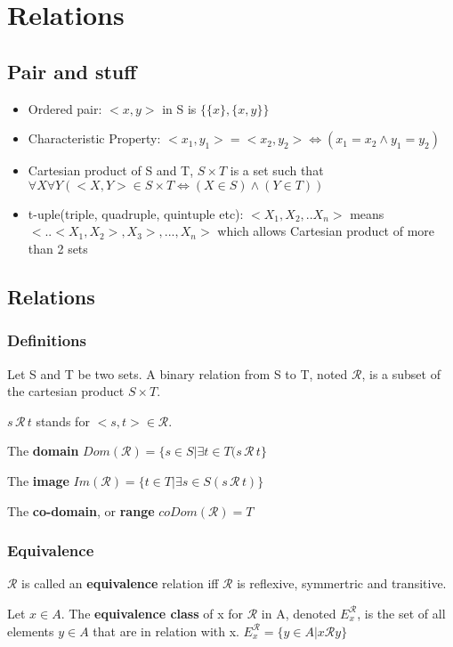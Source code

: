 \documentclass[11pt, twocolumn]{article}
\newenvironment{compactitem}
{\begin{itemize}
  \setlength{\itemsep}{1px}
  \setlength{\parskip}{0pt}
  \setlength{\parsep}{0pt}}
{\end{itemize}}
\begin{document}
\section{Relations}
\subsection{Pair and stuff}
\begin{compactitem}
\item Ordered pair: $<x, y>$ in S is $\{\{x\}, \{x, y\}\}$
\item Characteristic Property: $<x_1,y_1>=<x_2,y_2>\Leftrightarrow(x_1=x_2\land y_1=y_2)$
\item Cartesian product of S and T, $S\times T$ is a set such that
$\forall X\forall Y(<X, Y>\in S\times T\Leftrightarrow(X\in S)\land(Y\in T))$
\item t-uple(triple, quadruple, quintuple etc): $<X_1,X_2,..X_n>$ means $<..<X_1,X_2>,X_3>,...,X_n>$ which allows Cartesian product of more than 2 sets
\end{compactitem}
\subsection{Relations}
\subsubsection{Definitions}
Let S and T be two sets. A binary relation from S to T, noted $\mathcal{R}$, is a subset of the cartesian product $S\times T$.

$s\,\mathcal{R}\,t$ stands for $<s,t>\in\mathcal{R}$.

The \textbf{domain} $Dom(\mathcal{R})=\{s\in S|\exists t\in T(s\,\mathcal{R}\,t\}$

The \textbf{image} $Im(\mathcal{R})=\{t\in T|\exists s\in S(s\,\mathcal{R}\,t)\}$

The \textbf{co-domain}, or \textbf{range} $coDom(\mathcal{R})=T$
\subsubsection{Equivalence}
$\mathcal{R}$ is called an \textbf{equivalence} relation iff $\mathcal{R}$ is reflexive, symmertric and transitive.

Let $x\in A$. The \textbf{equivalence class} of x for $\mathcal{R}$ in A, denoted $E_x^\mathcal{R}$, is the set of all elements $y\in A$ that are in relation with x. $E_x^\mathcal{R}=\{y\in A|x\mathcal{R}y\}$
\end{document}
